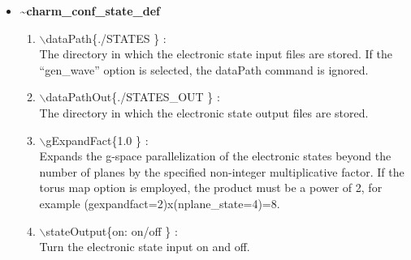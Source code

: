 \begin{itemize}
\clearpage
\huge
\item[] {\bf \~{ }charm\_conf\_state\_def}
\begin{enumerate}
  \vspace{0.15in} \Large
  \item $\backslash$dataPath\{./STATES \} : \\    \large
  The directory in which the electronic state input files are
  stored. If the ``gen\_wave'' option is selected, the dataPath
  command is ignored.
  \vspace{0.15in} \Large
  \item $\backslash$dataPathOut\{./STATES\_OUT \} : \\    \large
  The directory in which the electronic state output files are stored.
  \vspace{0.15in} \Large
  \item $\backslash$gExpandFact\{1.0 \} : \\    \large
  Expands the g-space parallelization of the electronic states beyond the number of planes by
  the specified non-integer multiplicative factor. If the torus map option is
  employed, the product must be a power of 2, for example 
 (gexpandfact=2)x(nplane\_state=4)=8.
  \vspace{0.15in} \Large
  \item $\backslash$stateOutput\{on: on/off \} : \\    \large
  Turn the electronic state input on and off.
\end{enumerate}


\end{itemize}
